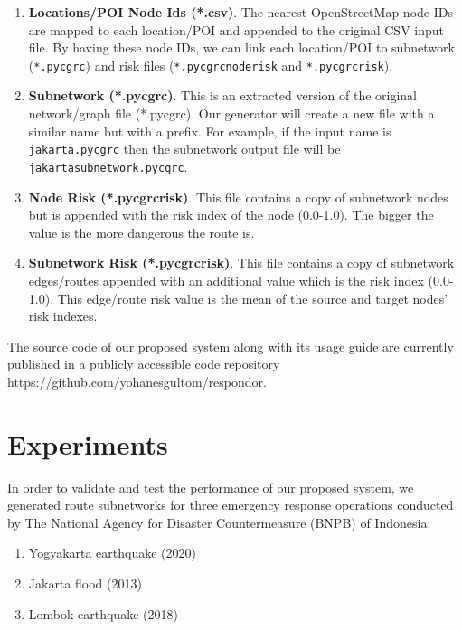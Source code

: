 \documentclass[conference]{IEEEtran}
\begin{document}
\begin{enumerate}

\item \textbf{Locations/POI Node Ids (*.csv)}. The nearest OpenStreetMap node IDs are mapped to each location/POI and appended to the original CSV input file. By having these node IDs, we can link each location/POI to subnetwork (\texttt{*.pycgrc}) and risk files (\texttt{*.pycgrc\textunderscore node\textunderscore risk} and \texttt{*.pycgrc\textunderscore risk}).

\item \textbf{Subnetwork (*.pycgrc)}. This is an extracted version of the original network/graph file (*.pycgrc). Our generator will create a new file with a similar name but with a prefix. For example, if the input name is \texttt{jakarta.pycgrc} then the subnetwork output file will be \texttt{jakarta\textunderscore subnetwork.pycgrc}.

\item \textbf{Node Risk (*.pycgrc\textunderscore risk)}. This file contains a copy of subnetwork nodes but is appended with the risk index of the node (0.0-1.0). The bigger the value is the more dangerous the route is.

\item \textbf{Subnetwork Risk (*.pycgrc\textunderscore risk)}. This file contains a copy of subnetwork edges/routes appended with an additional value which is the risk index (0.0-1.0). This edge/route risk value is the mean of the source and target nodes' risk indexes.

\end{enumerate}

The source code of our proposed system along with its usage guide are currently published in a publicly accessible code repository https://github.com/yohanesgultom/respondor.


\section{Experiments}

In order to validate and test the performance of our proposed system, we generated route subnetworks for three emergency response operations conducted by The National Agency for Disaster Countermeasure (BNPB) of Indonesia:

\begin{enumerate}
\item Yogyakarta earthquake (2020)
\item Jakarta flood (2013)
\item Lombok earthquake (2018)
\end{enumerate}
\end{document}
